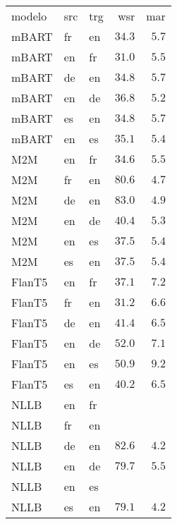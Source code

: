 \begin{tabular}{lllrr}
modelo & src & trg & wsr & mar \\
mBART & fr & en & $34.3$ & $5.7$ \\
mBART & en & fr & $31.0$ & $5.5$ \\
mBART & de & en & $34.8$ & $5.7$ \\
mBART & en & de & $36.8$ & $5.2$ \\
mBART & es & en & $34.8$ & $5.7$ \\
mBART & en & es & $35.1$ & $5.4$ \\
M2M & en & fr & $34.6$ & $5.5$ \\
M2M & fr & en & $80.6$ & $4.7$ \\
M2M & de & en & $83.0$ & $4.9$ \\
M2M & en & de & $40.4$ & $5.3$ \\
M2M & en & es & $37.5$ & $5.4$ \\
M2M & es & en & $37.5$ & $5.4$ \\
FlanT5 & en & fr & $37.1$ & $7.2$ \\
FlanT5 & fr & en & $31.2$ & $6.6$ \\
FlanT5 & de & en & $41.4$ & $6.5$ \\
FlanT5 & en & de & $52.0$ & $7.1$ \\
FlanT5 & en & es & $50.9$ & $9.2$ \\
FlanT5 & es & en & $40.2$ & $6.5$ \\
NLLB & en & fr &  &  \\
NLLB & fr & en &  &  \\
NLLB & de & en & $82.6$ & $4.2$ \\
NLLB & en & de & $79.7$ & $5.5$ \\
NLLB & en & es &  &  \\
NLLB & es & en & $79.1$ & $4.2$ \\
\end{tabular}
